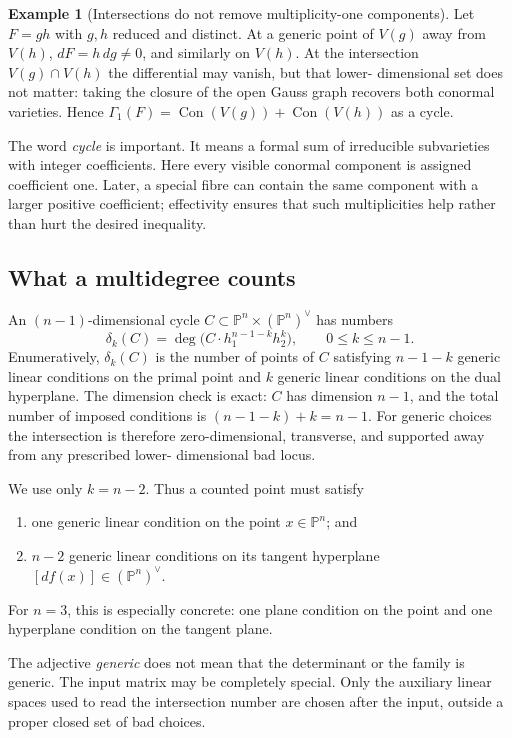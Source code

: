 \documentclass[acmsmall,screen,nonacm]{acmart}
\theoremstyle{definition}
\newtheorem{example}{Example}[section]
\theoremstyle{remark}
\DeclareMathOperator{\Con}{Con}
\newcommand{\PP}{\mathbb{P}}
\newcommand{\pdeg}{\delta}
\newcommand{\Gone}{\Gamma_{\!1}}
\begin{document}
\begin{example}[Intersections do not remove multiplicity-one components]
Let $F=gh$ with $g,h$ reduced and distinct.  At a generic point of $V(g)$
away from $V(h)$, $dF=h\,dg\ne0$, and similarly on $V(h)$.  At the
intersection $V(g)\cap V(h)$ the differential may vanish, but that lower-
dimensional set does not matter: taking the closure of the open Gauss graph
recovers both conormal varieties.  Hence
$\Gone(F)=\Con(V(g))+\Con(V(h))$ as a cycle.
\end{example}

The word \emph{cycle} is important.  It means a formal sum of irreducible
subvarieties with integer coefficients.  Here every visible conormal component
is assigned coefficient one.  Later, a special fibre can contain the same
component with a larger positive coefficient; effectivity ensures that such
multiplicities help rather than hurt the desired inequality.

\subsection{What a multidegree counts}\label{sec:multidegree}

An $(n-1)$-dimensional cycle $C\subset\PP^n\times(\PP^n)^\vee$ has numbers
\[
  \pdeg_k(C)=\deg\big(C\cdot h_1^{n-1-k}h_2^k\big),
  \qquad 0\le k\le n-1.
\]
Enumeratively, $\pdeg_k(C)$ is the number of points of $C$ satisfying
$n-1-k$ generic linear conditions on the primal point and $k$ generic linear conditions on the dual hyperplane.  The dimension check is exact:
$C$ has dimension $n-1$, and the total number of imposed conditions is
$(n-1-k)+k=n-1$.  For generic choices the intersection is therefore
zero-dimensional, transverse, and supported away from any prescribed lower-
dimensional bad locus.

We use only $k=n-2$.  Thus a counted point must satisfy
\begin{enumerate}[leftmargin=2.2em,itemsep=1pt]
\item one generic linear condition on the point $x\in\PP^n$; and
\item $n-2$ generic linear conditions on its tangent hyperplane
$[df(x)]\in(\PP^n)^\vee$.
\end{enumerate}
For $n=3$, this is especially concrete: one plane condition on the point and
one hyperplane condition on the tangent plane.

The adjective \emph{generic} does not mean that the determinant or the family
is generic.  The input matrix may be completely special.  Only the auxiliary
linear spaces used to read the intersection number are chosen after the input,
outside a proper closed set of bad choices.
\end{document}
